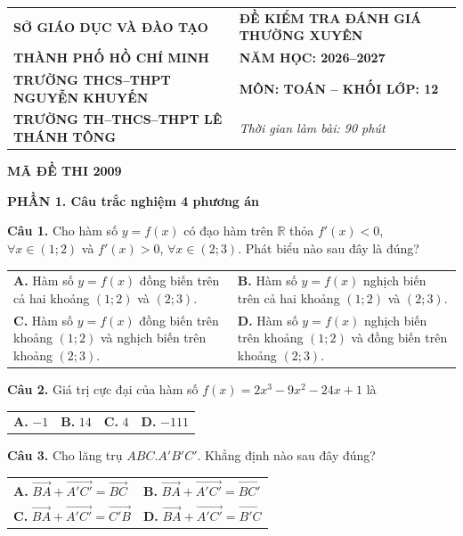 \documentclass[12pt,a4paper]{article}
\begin{document}
\noindent
\begin{tabular}{@{}p{}p{}@{}}
\textbf{SỞ GIÁO DỤC VÀ ĐÀO TẠO} & \textbf{ĐỀ KIỂM TRA ĐÁNH GIÁ THƯỜNG XUYÊN} \\
\textbf{THÀNH PHỐ HỒ CHÍ MINH} & \textbf{NĂM HỌC: 2026--2027} \\
\textbf{TRƯỜNG THCS--THPT NGUYỄN KHUYẾN} & \textbf{MÔN: TOÁN -- KHỐI LỚP: 12} \\
\textbf{TRƯỜNG TH--THCS--THPT LÊ THÁNH TÔNG} & \textit{Thời gian làm bài: 90 phút}
\end{tabular}

\begin{center}
\textbf{\large MÃ ĐỀ THI 2009}
\end{center}

\vspace{0.3cm}
\noindent\textbf{\large PHẦN 1. Câu trắc nghiệm 4 phương án}

\vspace{0.2cm}
\textbf{Câu 1.} Cho hàm số $y = f(x)$ có đạo hàm trên $\mathbb{R}$ thỏa $f'(x) < 0$, $\forall x \in (1; 2)$ và $f'(x) > 0$, $\forall x \in (2; 3)$. Phát biểu nào sau đây là đúng?

\noindent
\begin{tabular}{@{}p{}p{}@{}}
\textbf{A.} Hàm số $y = f(x)$ đồng biến trên cả hai khoảng $(1; 2)$ và $(2; 3)$. &
\textbf{B.} Hàm số $y = f(x)$ nghịch biến trên cả hai khoảng $(1; 2)$ và $(2; 3)$. \\
\textbf{C.} Hàm số $y = f(x)$ đồng biến trên khoảng $(1; 2)$ và nghịch biến trên khoảng $(2; 3)$. &
\textbf{D.} Hàm số $y = f(x)$ nghịch biến trên khoảng $(1; 2)$ và đồng biến trên khoảng $(2; 3)$.
\end{tabular}

\vspace{0.3cm}
\textbf{Câu 2.} Giá trị cực đại của hàm số $f(x) = 2x^3 - 9x^2 - 24x + 1$ là

\noindent
\begin{tabular}{@{}p{}p{}p{}p{}@{}}
\textbf{A.} $-1$ & \textbf{B.} $14$ & \textbf{C.} $4$ & \textbf{D.} $-111$
\end{tabular}

\vspace{0.3cm}
\textbf{Câu 3.} Cho lăng trụ $ABC.A'B'C'$. Khẳng định nào sau đây đúng?

\noindent
\begin{tabular}{@{}p{}p{}@{}}
\textbf{A.} $\overrightarrow{BA} + \overrightarrow{A'C'} = \overrightarrow{BC}$ &
\textbf{B.} $\overrightarrow{BA} + \overrightarrow{A'C'} = \overrightarrow{BC'}$ \\
\textbf{C.} $\overrightarrow{BA} + \overrightarrow{A'C'} = \overrightarrow{C'B}$ &
\textbf{D.} $\overrightarrow{BA} + \overrightarrow{A'C'} = \overrightarrow{B'C}$
\end{tabular}
\end{document}
